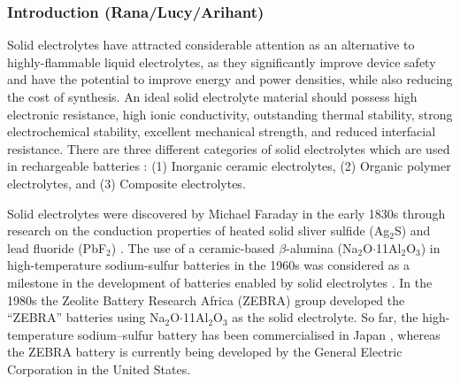 \documentclass[../main.tex]{subfiles}
\begin{document}
\subsubsection{Introduction (Rana/Lucy/Arihant)}

Solid electrolytes have attracted considerable attention as an alternative to highly-flammable liquid electrolytes, as they significantly improve device safety and have the potential to improve energy and power densities, while also reducing the cost of synthesis. \cite{janek_solid_2016, culver_designing_2018, famprikis_fundamentals_2019, goodenough_li-ion_2013, DIRICAN201927} An ideal solid electrolyte material should possess high electronic resistance, high ionic conductivity, outstanding thermal stability, strong electrochemical stability, excellent mechanical strength, and reduced interfacial resistance. \cite{han2020recent, manthiram2017} There are three different categories of solid electrolytes which are used in rechargeable batteries \cite{DIRICAN201927}: (1) Inorganic ceramic electrolytes, (2) Organic polymer electrolytes, and (3) Composite electrolytes. 

Solid electrolytes were discovered by Michael Faraday in the early 1830s through research on the conduction properties of heated solid sliver sulfide (Ag$_{2}$S) and lead fluoride (PbF$_{2}$) \cite{Faraday1833}.  The use of a ceramic-based $\beta$-alumina (Na$_{2}$O$\cdot$11Al$_{2}$O$_{3}$) in high-temperature sodium-sulfur batteries in the 1960s was considered as a milestone in the development of batteries enabled by solid electrolytes \cite{armand2008building}. In the 1980s the Zeolite Battery Research Africa (ZEBRA) group developed the ``ZEBRA'' batteries using Na$_{2}$O$\cdot$11Al$_{2}$O$_{3}$ as the solid electrolyte. \cite{ZEBRA} So far, the high-temperature sodium–sulfur battery has been commercialised in Japan \cite{oshima2004}, whereas the ZEBRA battery is currently being developed by the General Electric Corporation in the United States. \cite{capasso2014} 
\end{document}
